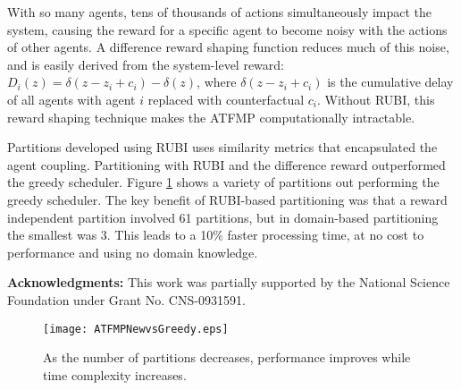 \documentclass{aamas_extabstract}
\begin{document}
With so many agents, tens of thousands of actions simultaneously impact the system, causing the reward for a specific agent to become noisy with the actions of other agents. A difference reward shaping function reduces much of this noise, and is easily derived from the system-level reward: $D_i(z) = \delta(z-z_i + c_i) - \delta(z)$, where \textit{$\delta(z-z_i + c_i)$} is the cumulative delay of all agents with agent $i$ replaced with counterfactual \textit{$c_i$}. Without RUBI, this reward shaping technique makes the ATFMP computationally intractable.

Partitions developed using RUBI uses similarity metrics that encapsulated the agent coupling. Partitioning with RUBI and the difference reward outperformed the greedy scheduler. Figure \ref{ATFMPNewvsGreedy} shows a variety of partitions out performing the greedy scheduler. The key benefit of RUBI-based partitioning was that a reward independent partition involved 61 partitions, but in domain-based partitioning the smallest was 3. This leads to a 10\% faster processing time, at no cost to performance and using no domain knowledge.

\textbf{Acknowledgments:} This work was partially  supported by the National Science Foundation  under Grant No. CNS-0931591.

%
\begin{figure}
\centering
\texttt{[image: ATFMPNewvsGreedy.eps]}
\caption{As the number of partitions decreases, performance improves while time complexity increases.}
\label{ATFMPNewvsGreedy}
\end{figure}
%
\end{document}
